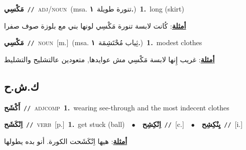 \documentclass[10pt,a4paper,twoside]{article} %
\begin{document}
\begin{multicols}{2}
{\setlength\topsep{0pt}\textbf{\foreignlanguage{arabic}{مَكْسِي}}\ {\color{gray}\texttt{//}\color{black}}\ \textsc{adj/noun}\ \color{gray}(msa. \foreignlanguage{arabic}{تنورة طويلة}~\foreignlanguage{arabic}{\textbf{١.}})\color{black}\ \textbf{1.}~long (skirt)\  \begin{flushright}\color{gray}\foreignlanguage{arabic}{\textbf{\underline{\foreignlanguage{arabic}{أمثلة}}}: كُانت لابسة تنورة مَكْسِي لونها بني مع بلوزة صوف صفرا}\end{flushright}\color{black}} \vspace{2mm}

{\setlength\topsep{0pt}\textbf{\foreignlanguage{arabic}{مَكْسِي}}\ {\color{gray}\texttt{//}\color{black}}\ \textsc{noun}\ [m.]\ \color{gray}(msa. \foreignlanguage{arabic}{ثِياب مُحْتَشِمَة}~\foreignlanguage{arabic}{\textbf{١.}})\color{black}\ \textbf{1.}~modest clothes\  \begin{flushright}\color{gray}\foreignlanguage{arabic}{\textbf{\underline{\foreignlanguage{arabic}{أمثلة}}}: غريب إِنها لابسة مَكْسِي مش عوايدها, متعودين عالتشليح والتشليط}\end{flushright}\color{black}} \vspace{2mm}

\vspace{-3mm}
\subsection*{\color{blue}\foreignlanguage{arabic}{ك.ش.ح}\color{blue}{}} 

{\setlength\topsep{0pt}\textbf{\foreignlanguage{arabic}{أَكْشَح}}\ {\color{gray}\texttt{//}\color{black}}\ \textsc{adj\textunderscore comp}\ \textbf{1.}~wearing see-through and the most indecent clothes\ } \vspace{2mm}

{\setlength\topsep{0pt}\textbf{\foreignlanguage{arabic}{اِنْكَشَح}}\ {\color{gray}\texttt{//}\color{black}}\ \textsc{verb}\ [p.]\ \textbf{1.}~get stuck (ball)\ \ $\bullet$\ \ \setlength\topsep{0pt}\textbf{\foreignlanguage{arabic}{اِنْكِشِح}}\ {\color{gray}\texttt{//}\color{black}}\ [c.]\ \ $\bullet$\ \ \setlength\topsep{0pt}\textbf{\foreignlanguage{arabic}{يِنْكِشِح}}\ {\color{gray}\texttt{//}\color{black}}\ [i.]\  \begin{flushright}\color{gray}\foreignlanguage{arabic}{\textbf{\underline{\foreignlanguage{arabic}{أمثلة}}}: هيها اِنْكَشَحت الكورة. أنو بده يطولها}\end{flushright}\color{black}} \vspace{2mm}


\end{multicols}
\end{document}
